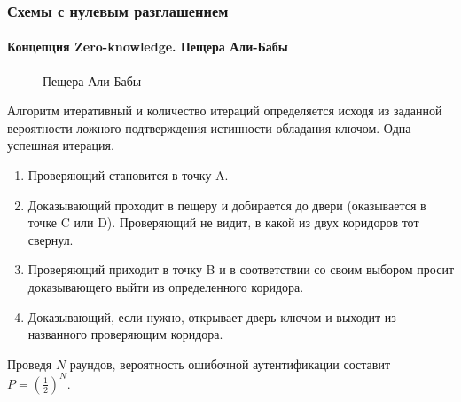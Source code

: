 \begin{frame}
\frametitle{Схемы с нулевым разглашением}
\framesubtitle{Концепция Zero-knowledge. Пещера Али-Бабы}
\begin{figure}
    \begin{center}
    \end{center}
    \caption{Пещера Али-Бабы}\label{pict:zeroknowali}
\end{figure}
\end{frame}


Алгоритм итеративный и количество итераций определяется исходя из заданной вероятности  ложного подтверждения истинности обладания ключом. Одна успешная итерация.


\begin{enumerate}
    \item Проверяющий становится в точку A.
    \item Доказывающий проходит в пещеру и добирается до двери (оказывается в точке C или D). Проверяющий не видит, в какой из двух коридоров тот свернул.
    \item Проверяющий приходит в точку B и в соответствии со своим выбором просит доказывающего выйти из определенного коридора.
    \item Доказывающий, если нужно, открывает дверь ключом и выходит из названного проверяющим коридора.
\end{enumerate}
Проведя $N$ раундов, вероятность ошибочной аутентификации составит $P=\left(\frac{1}{2}\right)^N$.


